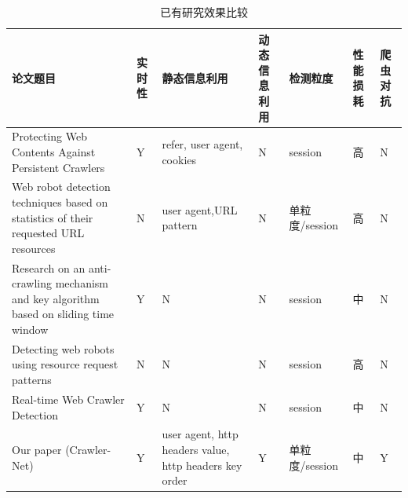 \documentclass[doctor,privacy,twoside]{buaa_mac}
\begin{document}
\centerline{}
\begin{table}[h]
  \caption{已有研究效果比较}
  \label{tab:anti-crawler-now}
  \centering
\begin{tabular}{|p{4cm}<{\centering}|p{1cm}<{\centering}|p{3cm}<{\centering}|p{1cm}<{\centering}|p{1.5cm}<{\centering}|p{1cm}<{\centering}|p{1cm}<{\centering}|}
    \hline
    论文题目                                                                                  & 实时性 & 静态信息利用                                                 & 动态信息利用 & 检测粒度        & 性能损耗 & 爬虫对抗 \\
    \hline
    Protecting Web Contents Against Persistent Crawlers                                   & Y   & refer, user agent, cookies                             & N      & session     & 高    & N    \\ 
    \hline
    Web robot detection techniques based on statistics of their requested URL resources   & N   & user agent,URL pattern                                 & N      & 单粒度/session & 高    & N    \\
    \hline
    Research on an anti-crawling mechanism and key algorithm based on sliding time window & Y   & N                                                      & N      & session     & 中    & N    \\ 
    \hline
    Detecting web robots using resource request patterns                                  & N   & N                                                      & N      & session     & 高    & N    \\
    \hline
    Real-time Web Crawler Detection                                                       & Y   & N                                                      & N      & session     & 中    & N    \\
    \hline
    Our paper (Crawler-Net)                                                               & Y   & user agent, http headers value, http headers key order & Y      & 单粒度/session & 中    & Y    \\
    \hline
    \end{tabular}
\end{table}
\end{document}
